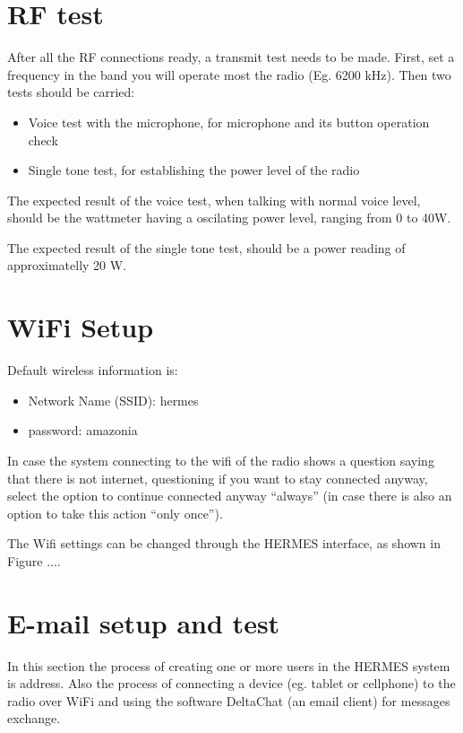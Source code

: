 \documentclass[11pt,a4paper]{article}
\begin{document}
\section{RF test}
After all the RF connections ready, a transmit test needs to be made. First, set a frequency
in the band you will operate most the radio (Eg. 6200 kHz). Then two tests should be carried:
\begin{itemize}
\item Voice test with the microphone, for microphone and its button operation check
\item Single tone test, for establishing the power level of the radio
\end{itemize}

The expected result of the voice test, when talking with normal voice level, should be the wattmeter having a oscilating power level,
ranging from 0 to 40W.



The expected result of the single tone test, should be a power reading of approximatelly 20 W.


\section{WiFi Setup}
\label{sec:wifi}

Default wireless information is:
\begin{itemize}
\item Network Name (SSID): hermes
\item password: amazonia
\end{itemize}

In case the system connecting to the wifi of the radio shows a question saying that there is not internet,
questioning if you want to stay connected anyway, select the option to continue connected anyway ``always'' (in
case there is also an option to take this action ``only once'').

The Wifi settings can be changed through the HERMES interface, as shown in Figure ....


\section{E-mail setup and test}

In this section the process of creating one or more users in the HERMES system is address. Also the process
of connecting a device (eg. tablet or cellphone) to the radio over WiFi and using the software DeltaChat (an email client)
for messages exchange.
\end{document}
